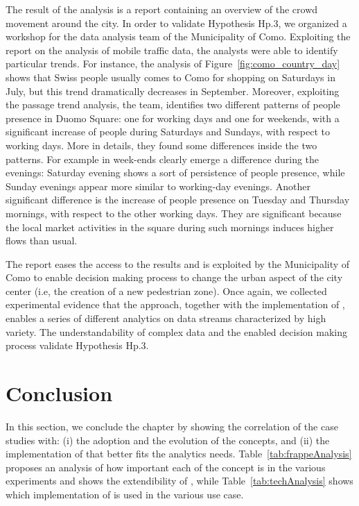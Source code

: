 The result of the analysis is a report containing an overview of the crowd movement around the city.
In order to validate Hypothesis \textsf{Hp.3}, we organized a workshop for the data analysis team of the Municipality of Como.
Exploiting the report on the analysis of mobile traffic data, the analysts were able to identify particular trends. For instance, the analysis of Figure~\ref{fig:como_country_day} shows that Swiss people usually comes to Como for shopping on Saturdays in July, but this trend dramatically decreases in September.
Moreover, exploiting the passage trend analysis, the team, identifies two different patterns of people presence in Duomo Square: one for working days and one for weekends, with a significant increase of people during Saturdays and Sundays, with respect to working days.
More in details, they found some differences inside the two patterns. For example in week-ends clearly emerge a difference during the evenings: Saturday evening shows a sort of persistence of people presence, while Sunday evenings appear more similar to working-day evenings. Another significant difference is the increase of people presence on Tuesday and Thursday mornings, with respect to the other working days. They are significant because the local market activities in the square during such mornings induces higher flows than usual.

The report eases the access to the results and is exploited by the Municipality of Como to enable decision making process to change the urban aspect of the city center (i.e,  the creation of a new pedestrian zone).
Once again, we collected experimental evidence that the \frappe{} approach, together with the \sparkdi{} implementation of \river{}, enables a series of different analytics on data streams characterized by high variety.
The understandability of complex data and the enabled decision making process validate Hypothesis \textsf{Hp.3}.

\section{Conclusion} \label{sec:cs-conclusion}
In this section, we conclude the chapter by showing the correlation of the case studies with: (i) the adoption and the evolution of the \frappe{} concepts, and (ii) the implementation of \river{} that better fits the analytics needs.
Table~\ref{tab:frappeAnalysis} proposes an analysis of how important each of the \frappe{} concept is in the various experiments and shows the extendibility of \frappe{}, while Table~\ref{tab:techAnalysis} shows which implementation of \river{} is used in the various use case. 

